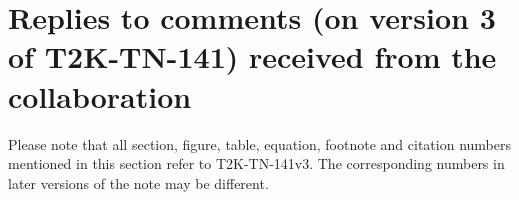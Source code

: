\clearpage

\section{Replies to comments (on version 3 of T2K-TN-141) received from the collaboration}

{\color{red}
Please note that all section, figure, table, equation, footnote and citation 
numbers mentioned in this section refer to T2K-TN-141v3. 
The corresponding numbers in later versions of the note may be different.
}

